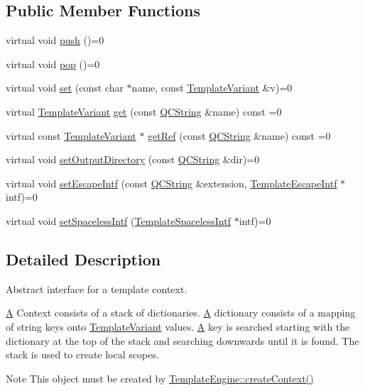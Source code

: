 \subsection*{Public Member Functions}
\begin{DoxyCompactItemize}
\item 
virtual void \mbox{\hyperlink{class_template_context_aac3a3e3c8e604db05e74cba7b1ce8554}{push}} ()=0
\item 
virtual void \mbox{\hyperlink{class_template_context_a853868792ccd7f9c5fed55338d23d019}{pop}} ()=0
\item 
virtual void \mbox{\hyperlink{class_template_context_a99d037bab858efc4fa8602fae3a5af9c}{set}} (const char $\ast$name, const \mbox{\hyperlink{class_template_variant}{Template\+Variant}} \&v)=0
\item 
virtual \mbox{\hyperlink{class_template_variant}{Template\+Variant}} \mbox{\hyperlink{class_template_context_a6d65a9047de8ec4363612e576031e781}{get}} (const \mbox{\hyperlink{class_q_c_string}{Q\+C\+String}} \&name) const =0
\item 
virtual const \mbox{\hyperlink{class_template_variant}{Template\+Variant}} $\ast$ \mbox{\hyperlink{class_template_context_ac73a3e85149ff072aea9e3ab091c4ed1}{get\+Ref}} (const \mbox{\hyperlink{class_q_c_string}{Q\+C\+String}} \&name) const =0
\item 
virtual void \mbox{\hyperlink{class_template_context_ab3aaaa03df934615ccfa3209420cd93d}{set\+Output\+Directory}} (const \mbox{\hyperlink{class_q_c_string}{Q\+C\+String}} \&dir)=0
\item 
virtual void \mbox{\hyperlink{class_template_context_afad803f8d522fb63ad4b91a2034b06a0}{set\+Escape\+Intf}} (const \mbox{\hyperlink{class_q_c_string}{Q\+C\+String}} \&extension, \mbox{\hyperlink{class_template_escape_intf}{Template\+Escape\+Intf}} $\ast$intf)=0
\item 
virtual void \mbox{\hyperlink{class_template_context_a11e64f588d21aeda2b57a4bc4e06ecc7}{set\+Spaceless\+Intf}} (\mbox{\hyperlink{class_template_spaceless_intf}{Template\+Spaceless\+Intf}} $\ast$intf)=0
\end{DoxyCompactItemize}


\subsection{Detailed Description}
Abstract interface for a template context. 

\mbox{\hyperlink{class_a}{A}} Context consists of a stack of dictionaries. \mbox{\hyperlink{class_a}{A}} dictionary consists of a mapping of string keys onto \mbox{\hyperlink{class_template_variant}{Template\+Variant}} values. \mbox{\hyperlink{class_a}{A}} key is searched starting with the dictionary at the top of the stack and searching downwards until it is found. The stack is used to create local scopes. \begin{DoxyNote}{Note}
This object must be created by \mbox{\hyperlink{class_template_engine_a2c0d83df212c210406dc78f74fe3f2ad}{Template\+Engine\+::create\+Context()}} 
\end{DoxyNote}


